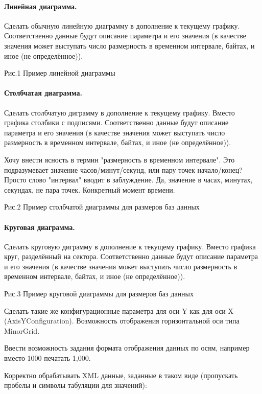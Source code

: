 \documentclass[10pt,a4paper]{article}
\begin{document}
\paragraph{Линейная диаграмма.}

Сделать обычную линейную диаграмму в дополнение к текущему графику.
Соответственно данные будут описание параметра и его значения (в качестве
значения может выступать число размерность в временном интервале, байтах, и иное
(не определённое)).

Рис.1 Пример линейной диаграммы

\paragraph{Столбчатая диаграмма.}

Сделать столбчатую диграмму в дополнение к текущему графику. Вместо графика
столбики с подписями. Соответственно данные будут описание параметра и его
значения (в качестве значения может выступать число размерность в временном
интервале, байтах, и иное (не определённое)).

Хочу внести ясность в термин "размерность в временном интервале". Это
подразумевает значение часов/минут/секунд, или пару точек начало/конец? Просто
слово "интервал" вводит в заблуждение. Да, значение в часах, минутах, секундах,
не пара точек. Конкретный момент времени.

Рис.2 Пример столбчатой диаграммы для размеров баз данных

\paragraph{Круговая диаграмма.}

Сделать круговую диграмму в дополнение к текущему графику. Вместо графика круг,
разделённый на сектора. Соответственно данные будут описание параметра и его
значения (в качестве значения может выступать число размерность в временном
интервале, байтах, и иное (не определённое)).

Рис.3 Пример круговой диаграммы для размеров баз данных

Сделать такие же конфигурационные параметра для оси Y как для оси X
(AxisYConfiguration). Возможность отображения горизонтальной оси типа MinorGrid.

Ввести возможность задания формата отображения данных по осям, например вместо
1000 печатать 1,000.

Корректно обрабатывать XML данные, заданные в таком виде (пропускать пробелы и
символы табуляции для значений):
\end{document}

